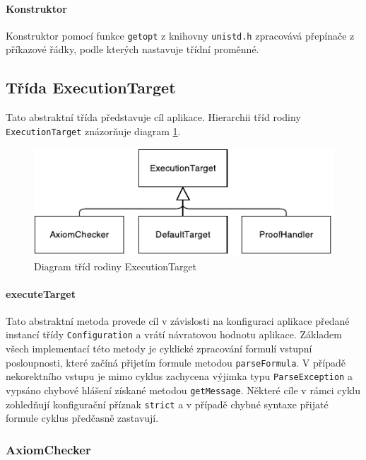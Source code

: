 \documentclass[thesis=B,czech,hidelinks]{thesis}[2012/06/26]
\begin{document}
\paragraph{Konstruktor}

Konstruktor pomocí funkce \texttt{getopt} z knihovny \texttt{unistd.h} zpracovává přepínače z příkazové řádky, podle kterých nastavuje třídní proměnné.

\subsection{Třída ExecutionTarget}

Tato abstraktní třída představuje cíl aplikace. Hierarchii tříd rodiny \texttt{ExecutionTarget} znázorňuje diagram \ref{fig:execution_target}.

\begin{figure}
\centering
\caption{Diagram tříd rodiny ExecutionTarget}
\label{fig:execution_target}
\includegraphics[width=\linewidth]{diagrams/execution_target}
\end{figure}

\paragraph{executeTarget}

Tato abstraktní metoda provede cíl v závislosti na konfiguraci aplikace předané instancí třídy \texttt{Configuration} a vrátí návratovou hodnotu aplikace. Základem všech implementací této metody je cyklické zpracování formulí vstupní posloupnosti, které začíná přijetím formule metodou \texttt{parseFormula}. V případě nekorektního vstupu je mimo cyklus zachycena výjimka typu \texttt{ParseException} a vypsáno chybové hlášení získané metodou \texttt{getMessage}. Některé cíle v rámci cyklu zohledňují konfigurační příznak \texttt{strict} a v případě chybné syntaxe přijaté formule cyklus předčasně zastavují.

\subsubsection{AxiomChecker}
\end{document}
